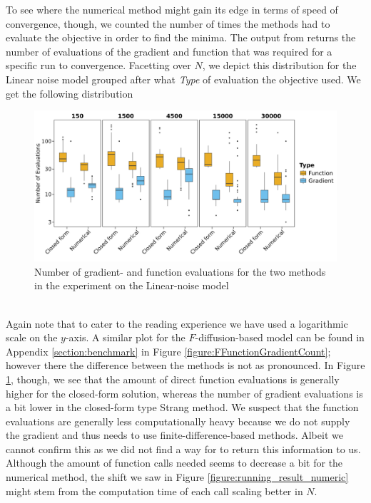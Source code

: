To see where the numerical method might gain its edge in terms of speed of convergence, though, we counted the number of times the methods had to evaluate the objective in order to find the minima. The  output from  returns the number of evaluations of the gradient and function that was required for a specific run to convergence. Facetting over $N$, we depict this distribution for the Linear noise model grouped after what \textit{Type} of evaluation the objective used. We get the following distribution
\begin{figure}[h!]
    \begin{center}
    \includegraphics[scale = .08]{figures/function_gradient_count_Linear_plot.jpeg}     
    \caption{Number of gradient- and function evaluations for the two methods in the experiment on the Linear-noise model}
    \label{figure:linearFunctionGradientCount}   
    \end{center}
\end{figure}\\
Again note that to cater to the reading experience we have used a logarithmic scale on the $y$-axis. A similar plot for the $F$-diffusion-based model can be found in Appendix \ref{section:benchmark} in Figure \ref{figure:FFunctionGradientCount}; however there the difference between the methods is not as pronounced. In Figure \ref{figure:linearFunctionGradientCount}, though, we see that the amount of direct function evaluations is generally higher for the closed-form solution, whereas the number of gradient evaluations is a bit lower in the closed-form type Strang method. We suspect that the function evaluations are generally less computationally heavy because we do not supply the gradient and  thus needs to use finite-difference-based methods. Albeit we cannot confirm this as we did not find a way for  to return this information to us. Although the amount of function calls needed seems to decrease a bit for the numerical method, the shift we saw in Figure \ref{figure:running_result_numeric} might stem from the computation time of each call scaling better in $N$.

